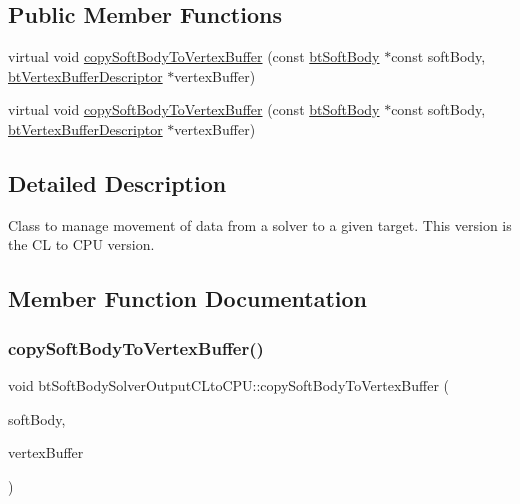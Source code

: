 \subsection*{Public Member Functions}
\begin{DoxyCompactItemize}
\item 
virtual void \hyperlink{classbtSoftBodySolverOutputCLtoCPU_a2ab37dd740cd08217468e4b9e74d73f5}{copy\+Soft\+Body\+To\+Vertex\+Buffer} (const \hyperlink{classbtSoftBody}{bt\+Soft\+Body} $\ast$const soft\+Body, \hyperlink{classbtVertexBufferDescriptor}{bt\+Vertex\+Buffer\+Descriptor} $\ast$vertex\+Buffer)
\item 
virtual void \hyperlink{classbtSoftBodySolverOutputCLtoCPU_a0bffbe9f32160155ff56e90a0d8f547b}{copy\+Soft\+Body\+To\+Vertex\+Buffer} (const \hyperlink{classbtSoftBody}{bt\+Soft\+Body} $\ast$const soft\+Body, \hyperlink{classbtVertexBufferDescriptor}{bt\+Vertex\+Buffer\+Descriptor} $\ast$vertex\+Buffer)
\end{DoxyCompactItemize}


\subsection{Detailed Description}
Class to manage movement of data from a solver to a given target. This version is the CL to C\+PU version. 

\subsection{Member Function Documentation}
\mbox{\label{classbtSoftBodySolverOutputCLtoCPU_a2ab37dd740cd08217468e4b9e74d73f5}} 
\subsubsection{\texorpdfstring{copy\+Soft\+Body\+To\+Vertex\+Buffer()}{copySoftBodyToVertexBuffer()}\hspace{0.1cm}{\footnotesize\ttfamily [1/2]}}
{\footnotesize\ttfamily void bt\+Soft\+Body\+Solver\+Output\+C\+Lto\+C\+P\+U\+::copy\+Soft\+Body\+To\+Vertex\+Buffer (\begin{DoxyParamCaption}\item[{const \hyperlink{classbtSoftBody}{bt\+Soft\+Body} $\ast$const}]{soft\+Body,  }\item[{\hyperlink{classbtVertexBufferDescriptor}{bt\+Vertex\+Buffer\+Descriptor} $\ast$}]{vertex\+Buffer }\end{DoxyParamCaption})\hspace{0.3cm}{\ttfamily [virtual]}}

